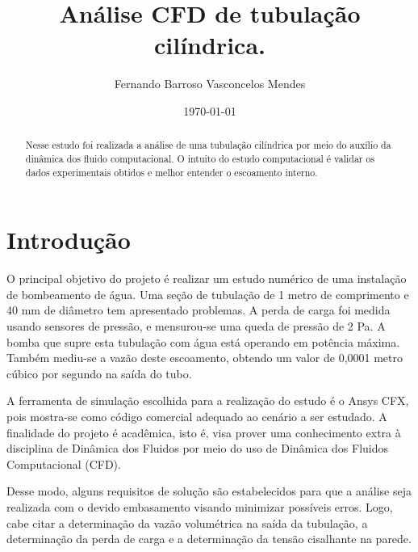 \documentclass[12pt]{article}
\begin{document}
\title{Análise CFD de tubulação cilíndrica.}
\author{Fernando Barroso Vasconcelos Mendes}
\date{\today}
\maketitle

\begin{abstract}
Nesse estudo foi realizada a análise de uma tubulação cilíndrica por meio do auxílio da dinâmica dos fluido computacional. O intuito do estudo computacional é validar os dados experimentais obtidos e melhor entender o escoamento interno.
\end{abstract}


\section{Introdução}


O principal objetivo do projeto é realizar um estudo numérico de uma instalação de bombeamento de água. Uma seção de tubulação de 1 metro de comprimento e 40 mm de diâmetro tem apresentado problemas. A perda de carga foi medida usando sensores de pressão, e mensurou-se uma queda de pressão de 2 Pa. A bomba que supre esta tubulação com água está operando em potência máxima. Também mediu-se a vazão deste escoamento, obtendo um valor de 0,0001 metro cúbico por segundo na saída do tubo.

A ferramenta de simulação escolhida para a realização do estudo é o Ansys CFX, pois mostra-se como código comercial adequado ao cenário a ser estudado. A finalidade do projeto é acadêmica, isto é, visa prover uma conhecimento extra à disciplina de Dinâmica dos Fluidos por meio do uso de Dinâmica dos Fluidos Computacional (CFD).

Desse modo, alguns requisitos de solução são estabelecidos para que a análise seja realizada com o devido embasamento visando minimizar possíveis erros. Logo, cabe citar a determinação da vazão volumétrica na saída da tubulação, a determinação da perda de carga e a determinação da tensão cisalhante na parede.
\end{document}
